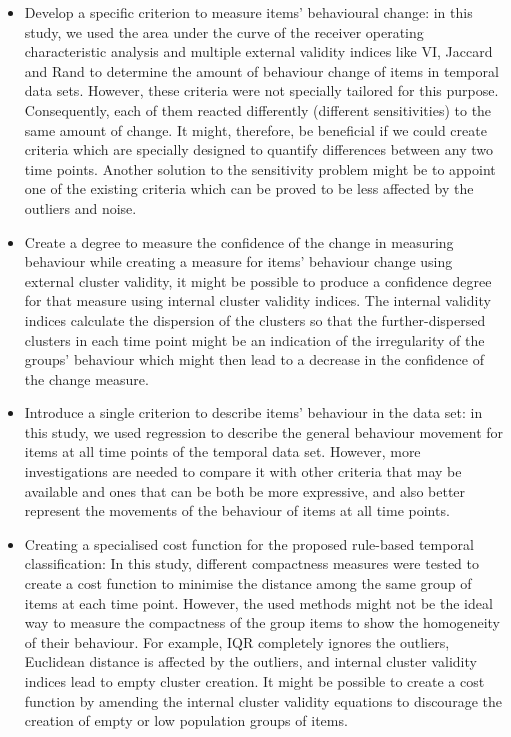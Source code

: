 \begin{itemize}
    
    \item Develop a specific criterion to measure items' behavioural change: in this study, we used the area under the curve of the receiver operating characteristic analysis and multiple external validity indices like VI, Jaccard and Rand to determine the amount of behaviour change of items in temporal data sets. However, these criteria were not specially tailored for this purpose. Consequently, each of them reacted differently (different sensitivities) to the same amount of change.  It might, therefore, be beneficial if we could create criteria which are specially designed to quantify differences between any two time points. Another solution to the sensitivity problem might be to appoint one of the existing criteria which can be proved to be less affected by the outliers and noise. 
    
    \item Create a degree to measure the confidence of the change in measuring behaviour while creating a measure for items' behaviour change using external cluster validity, it might be possible to produce a confidence degree for that measure using internal cluster validity indices. The internal validity indices calculate the dispersion of the clusters so that the further-dispersed clusters in each time point might be an indication of the irregularity of the groups' behaviour which might then lead to a decrease in the confidence of the change measure. 
    
    \item Introduce a single criterion to describe items' behaviour in the data set: in this study, we used regression to describe the general behaviour movement for items at all time points of the temporal data set. However, more investigations are needed to compare it with other criteria that may be available and ones that can be both be more expressive, and also better represent the movements of the behaviour of items at all time points. 
    
    \item Creating a specialised cost function for the proposed rule-based temporal classification: In this study, different compactness measures were tested to create a cost function to minimise the distance among the same group of items at each time point. However, the used methods might not be the ideal way to measure the compactness of the group items to show the homogeneity of their behaviour. For example, IQR completely ignores the outliers, Euclidean distance is affected by the outliers, and internal cluster validity indices lead to empty cluster creation. It might be possible to create a cost function by amending the internal cluster validity equations to discourage the creation of empty or low population groups of items. 
    

\end{itemize}
